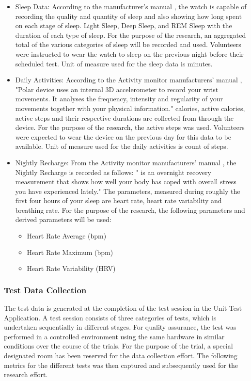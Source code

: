 \begin{itemize}
    \item Sleep Data: According to the manufacturer's manual \cite{polarManual}, the watch is capable of recording the quality and quantity of sleep and also showing how long spent on each stage of sleep. 
    Light Sleep, Deep Sleep, and REM Sleep with the duration of each type of sleep. For the purpose of the research, an aggregated total of the various categories of sleep will be recorded and used.
    Volunteers were instructed to wear the watch to sleep on the previous night before their scheduled test. Unit of measure used for the sleep data is minutes. 
    \item Daily Activities: According to the Activity monitor manufacturers' manual \cite{polarManual}, "Polar device uses an internal 3D accelerometer to record your wrist movements. It analyses the frequency, 
    intensity and regularity of your movements together with your physical information." calories, active calories, active steps and their respective durations are collected from through the device. For the 
    purpose of the research, the active steps was used. Volunteers were expected to wear the device on the previous day for this data to be available. Unit of measure used for the daily activities is count of steps.
    \item Nightly Recharge: From the Activity monitor manufacturers' manual \cite{polarManual}, the Nightly Recharge is recorded as follows: " is an overnight recovery measurement that shows how well your body has
    coped with overall stress you have experienced lately." The parameters, measured during roughly the first four hours of your sleep are heart rate, heart rate variability and breathing rate. For the purpose 
    of the research, the following parameters and derived parameters will be used:
    \begin{itemize}
        \item Heart Rate Average (bpm)
        \item Heart Rate Maximum (bpm)
        \item Heart Rate Variability (HRV)
    \end{itemize}
\end{itemize}

\subsubsection*{Test Data Collection}
The test data is generated at the completion of the test session in the Unit Test Application. A test session consists of three categories of tests, which is undertaken sequentially in different stages. 
For quality assurance, the test was performed in a controlled environment using the same hardware in similar conditions over the course of the trials. For the purpose of the trial, a special designated room
has been reserved for the data collection effort. The following metrics for the different tests was then captured and subsequently used for the research effort.

